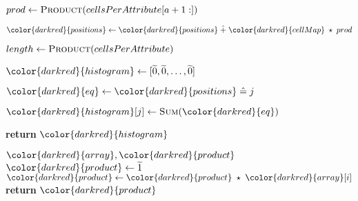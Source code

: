 \begin{algorithm}[H]
\begin{algorithmic}[1]
      \State $prod \gets \textsc{Product}(cellsPerAttribute[a+1:])$

      \State ${\color{darkred}{positions}} \gets {\color{darkred}{positions}} \hplus {\color{darkred}{cellMap}} \hmul prod$

    \EndFor

    \State $length \gets \textsc{Product}(cellsPerAttribute)$

    \State ${\color{darkred}{histogram}} \gets [\enc{0}, \enc{0}, \dots, \enc{0}]$
    


      \State ${\color{darkred}{eq}} \gets {\color{darkred}{positions}} \heq j$

      \State ${\color{darkred}{histogram}}[j] \gets \textsc{Sum}({\color{darkred}{eq}})$

    \EndFor

    \State \textbf{return} {${\color{darkred}{histogram}}$}
\EndProcedure

\begin{spacing}{0.5}
\end{spacing}

\Require ${\color{darkred}{array}}, {\color{darkred}{product}}$
    \State ${\color{darkred}{product}} \gets \enc{1}$
        \State ${\color{darkred}{product}} \gets {\color{darkred}{product}} \hmul {\color{darkred}{array}}[i]$
    \EndFor
    \State \textbf{return} {${\color{darkred}{product}}$}
\EndProcedure

\end{algorithmic}
\end{algorithm}
